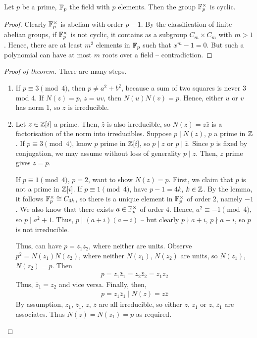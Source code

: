 \documentclass{../../template/note}
\begin{document}
    \begin{lemma}
        Let $p$ be a prime, $\mathbb F_p$ the field with $p$ elements. Then the group $\mathbb F_p^\times$ is cyclic.
    \end{lemma}
    
    \begin{proof}
        Clearly $\mathbb F_p^\times$ is abelian with order $p-1$. By the classification of finite abelian groups, if $\mathbb F_p^\times$ is not cyclic, it contains as a subgroup $C_m \times C_m$ with $m > 1$. Hence, there are at least $m^2$ elements in $\mathbb F_p$ such that $x^m - 1 = 0$. But such a polynomial can have at most $m$ roots over a field -- contradiction.
    \end{proof}
    
    \begin{proof}[Proof of theorem]
        There are many steps.
        \begin{enumerate}
            \item[$\impliedby$] If $p \equiv 3 \pmod 4$, then $p \neq a^2 + b^2$, because a sum of two squares is never 3 mod 4. If $N(z) = p$, $z=uv$, then $N(u)N(v) = p$. Hence, either $u$ or $v$ has norm 1, so $z$ is irreducible.
            \item[$\implies$] Let $z \in \mathbb Z[i]$ a prime. Then, $\bar z$ is also irreducible, so $N(z) = z\bar z$ is a factorisation of the norm into irreducibles. Suppose $p \mid N(z)$, $p$ a prime in $\mathbb Z$. If $p \equiv 3 \pmod 4$, know $p$ prime in $\mathbb Z[i]$, so $p \mid z$ or $p \mid \bar z$. Since $p$ is fixed by conjugation, we may assume without loss of generality $p \mid z$. Then, $z$ prime gives $z=p$.
            
            If $p \equiv 1 \pmod 4$, $p=2$, want to show $N(z) = p$. First, we claim that $p$ is not a prime in $\mathbb Z[i]$. If $p \equiv 1 \pmod 4$, have $p-1 = 4k$, $k \in \mathbb Z$. By the lemma, it follows $\mathbb F_p^\times \cong C_{4k}$, so there is a unique element in $\mathbb F_p^\times$ of order 2, namely $-1$. We also know that there exists $a \in \mathbb F_p^\times$ of order 4. Hence, $a^2 \equiv -1 \pmod 4$, so $p \mid a^2+1$. Thus, $p \mid (a+i)(a-i)$ -- but clearly $p \nmid a+i$, $p \nmid a-i$, so $p$ is not irreducible.

            Thus, can have $p = z_1z_2$, where neither are units. Observe $p^2 = N(z_1)N(z_2)$, where neither $N(z_1)$, $N(z_2)$ are units, so $N(z_1)$, $N(z_2) = p$. Then
            \begin{align*}
                p = z_1 \bar z_1 = z_2 \bar z_2 = z_1 z_2
            \end{align*}
            Thus, $\bar z_1 = z_2$ and vice versa. Finally, then, 
            \begin{align*}
                p = z_1 \bar z_1 \mid N(z) = z \bar z
            \end{align*}
            By assumption, $z_1$, $\bar z_1$, $z$, $\bar z$ are all irreducible, so either $z$, $z_1$ or $z$, $\bar z_1$ are associates. Thus $N(z) = N(z_1) = p$ as required.         
        \end{enumerate}
    \end{proof}
    
\end{document}
